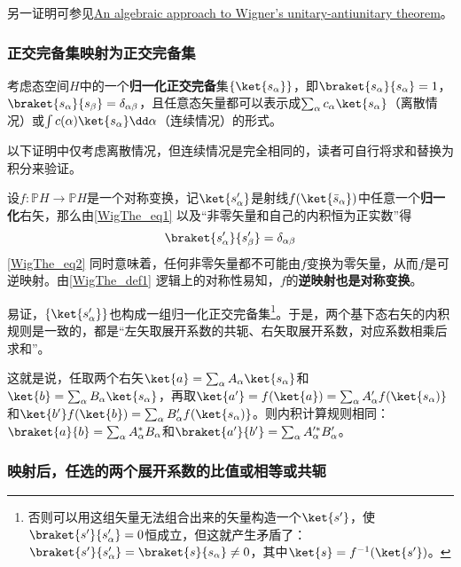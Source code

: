 另一证明可参见\href{https://arxiv.org/abs/math/9808033}{An algebraic approach to Wigner's unitary-antiunitary theorem}。

\subsubsection{正交完备集映射为正交完备集}

考虑态空间$H$中的一个\textbf{归一化正交完备}集$\{\ket{s_\alpha}\}$，即$\braket{s_\alpha}{s_\alpha}=1$，$\braket{s_\alpha}{s_\beta}=\delta_{\alpha\beta}$，且任意态矢量都可以表示成$\sum_\alpha c_\alpha\ket{s_\alpha}$（离散情况）或$\int c(\alpha)\ket{s_\alpha}\dd \alpha$（连续情况）的形式。

以下证明中仅考虑离散情况，但连续情况是完全相同的，读者可自行将求和替换为积分来验证。

设$f:\mathbb{P}H\to\mathbb{P}H$是一个对称变换，记$\ket{s'_\alpha}$是射线$f(\ket{\bar{s}_\alpha})$中任意一个\textbf{归一化}右矢，那么由\autoref{WigThe_eq1} 以及“非零矢量和自己的内积恒为正实数”得
\begin{equation}\label{WigThe_eq2}
\braket{s'_\alpha}{s'_\beta} = \delta_{\alpha\beta}
\end{equation}
\autoref{WigThe_eq2} 同时意味着，任何非零矢量都不可能由$f$变换为零矢量，从而$f$是可逆映射。由\autoref{WigThe_def1} 逻辑上的对称性易知，$f$的\textbf{逆映射也是对称变换}。

易证，$\{\ket{s'_\alpha}\}$也构成一组归一化正交完备集\footnote{否则可以用这组矢量无法组合出来的矢量构造一个$\ket{s'}$，使$\braket{s'}{s'_\alpha}=0$恒成立，但这就产生矛盾了：$\braket{s'}{s'_\alpha}=\braket{s}{s_\alpha}\neq 0$，其中$\ket{s}=f^{-1}(\ket{s'})$。}。于是，两个基下态右矢的内积规则是一致的，都是“左矢取展开系数的共轭、右矢取展开系数，对应系数相乘后求和”。

这就是说，任取两个右矢$\ket{a}=\sum_\alpha A_\alpha\ket{s_\alpha}$和$\ket{b}=\sum_\alpha B_\alpha\ket{s_\alpha}$，再取$\ket{a'}=f(\ket{a}) = \sum_\alpha A'_\alpha f(\ket{s_\alpha)}$和$\ket{b'}f(\ket{b}) = \sum_\alpha B'_\alpha f(\ket{s_\alpha)}$。则内积计算规则相同：$\braket{a}{b}=\sum_\alpha A^*_\alpha B_\alpha$和$\braket{a'}{b'}=\sum_\alpha A'^*_\alpha B'_\alpha$。

\subsubsection{映射后，任选的两个展开系数的比值或相等或共轭}



